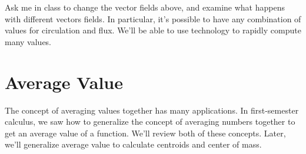 Ask me in class to change the vector fields above, and examine what happens with different vectors fields.  In particular, it's possible to have any combination of values for circulation and flux. We'll be able to use technology to rapidly compute many values. 









\section{Average Value}

The concept of averaging values together has many applications.  In first-semester calculus, we saw how to generalize the concept of averaging numbers together to get an average value of a function.  We'll review both of these concepts. Later, we'll generalize average value to calculate centroids and center of mass.


